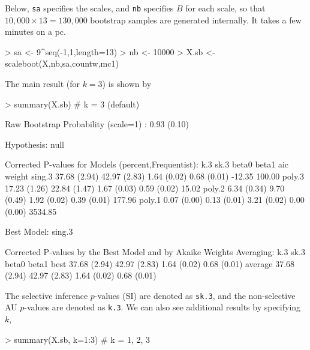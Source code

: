 \documentclass[a4paper]{amsart}
\begin{document}
Below, {\tt sa} specifies the scales, and {\tt nb} specifies
$B$ for each scale, so that $10,000\times13=130,000$ bootstrap samples
are generated internally.  It takes a few minutes on a pc.
\begin{Schunk}
\begin{Sinput}
> sa <- 9^seq(-1,1,length=13)
> nb <- 10000
> X.sb <- scaleboot(X,nb,sa,countw,mc1)
\end{Sinput}
\end{Schunk}
The main result (for $k=3$) is shown by
\begin{Schunk}
\begin{Sinput}
> summary(X.sb)  # k = 3 (default)
\end{Sinput}
\begin{Soutput}
Raw Bootstrap Probability (scale=1) : 0.93 (0.10)

Hypothesis: null 

Corrected P-values for Models (percent,Frequentist):
       k.3          sk.3         beta0       beta1       aic     weight 
sing.3 37.68 (2.94) 42.97 (2.83) 1.64 (0.02) 0.68 (0.01)  -12.35 100.00 
poly.3 17.23 (1.26) 22.84 (1.47) 1.67 (0.03) 0.59 (0.02)   15.02        
poly.2  6.34 (0.34)  9.70 (0.49) 1.92 (0.02) 0.39 (0.01)  177.96        
poly.1  0.07 (0.00)  0.13 (0.01) 3.21 (0.02) 0.00 (0.00) 3534.85        

Best Model:  sing.3 

Corrected P-values by the Best Model and by Akaike Weights Averaging:
        k.3          sk.3         beta0       beta1       
best    37.68 (2.94) 42.97 (2.83) 1.64 (0.02) 0.68 (0.01) 
average 37.68 (2.94) 42.97 (2.83) 1.64 (0.02) 0.68 (0.01) 
\end{Soutput}
\end{Schunk}
The selective inference $p$-values (SI) are denoted as {\tt sk.3},
and the non-selective AU $p$-values are denoted as {\tt k.3}.
We can also see additional results by specifying $k$,
\begin{Schunk}
\begin{Sinput}
> summary(X.sb, k=1:3)  # k = 1, 2, 3
\end{Sinput}
\end{Schunk}
\end{document}
